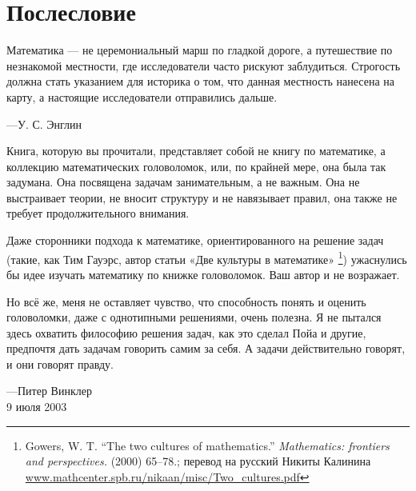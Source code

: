 \chapter*{Послесловие}

\setlength{\epigraphwidth}{.6\textwidth}
\epigraph{Математика --- не церемониальный марш по гладкой дороге, а путешествие по незнакомой местности, где исследователи часто рискуют заблудиться.
Строгость должна стать указанием для историка о том, что данная местность нанесена на карту, а настоящие исследователи отправились дальше.}{---У. С. Энглин
}

Книга, которую  вы прочитали, представляет собой не книгу по математике, а коллекцию математических головоломок, или, по крайней мере, она была так задумана.
Она посвящена задачам занимательным, а не важным.
Она не выстраивает теории, не вносит структуру и не навязывает правил, она также не требует продолжительного внимания.

Даже сторонники  подхода к математике, ориентированного на решение задач (такие, как Тим Гауэрс, автор статьи «Две культуры в математике»%
\footnote{Gowers, W. T. ``The two cultures of mathematics.'' \emph{Mathematics: frontiers and perspectives.} (2000) 65--78.; перевод на русский Никиты Калинина \href{http://www.mathcenter.spb.ru/nikaan/misc/Two_cultures.pdf}{\url{www.mathcenter.spb.ru/nikaan/misc/Two_cultures.pdf}}})
ужаснулись бы идее изучать математику по книжке головоломок.
Ваш автор и не возражает.

Но всё же, меня не оставляет чувство, что способность понять и оценить головоломки, даже с однотипными решениями, очень полезна.
Я не пытался здесь охватить  философию решения задач, как это сделал Пойа и другие, предпочтя дать задачам говорить самим за себя.
А задачи действительно говорят, и они говорят правду.

\begin{flushright}
---Питер Винклер
\\
9 июля 2003
\end{flushright}
